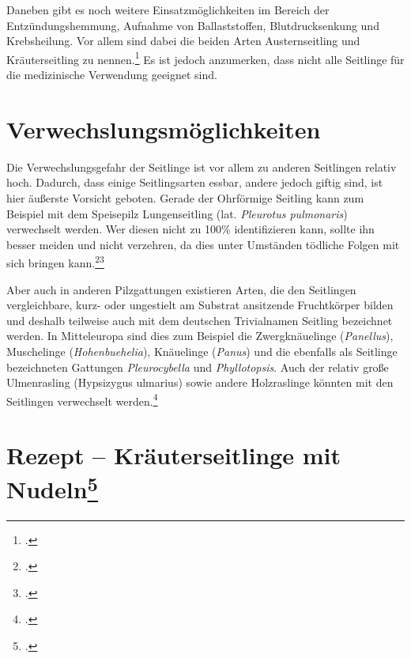 \documentclass[a4paper,abstracton]{scrreprt}
\begin{document}
Daneben gibt es noch weitere Einsatzmöglichkeiten im Bereich der Entzündungshemmung, Aufnahme von Ballaststoffen, Blutdrucksenkung und Krebsheilung.
Vor allem sind dabei die beiden Arten Austernseitling und Kräuterseitling zu nennen.\footcite{vital} Es ist jedoch anzumerken, dass nicht alle Seitlinge für die medizinische Verwendung geeignet sind.

\section{Verwechslungsmöglichkeiten}
Die Verwechslungsgefahr der Seitlinge ist vor allem zu anderen Seitlingen relativ hoch. Dadurch, dass einige Seitlingsarten essbar, andere jedoch giftig sind, ist hier äußerste Vorsicht geboten. Gerade der Ohrförmige Seitling kann zum Beispiel mit dem Speisepilz Lungenseitling (lat. \emph{Pleurotus pulmonaris}) verwechselt werden. Wer diesen nicht zu 100\% identifizieren kann, sollte ihn besser meiden und nicht verzehren, da dies unter Umständen tödliche Folgen mit sich bringen kann.\footcite{pg_ohrfoermig}\footcite{deutschlandradio}

Aber auch in anderen Pilzgattungen existieren Arten, die den Seitlingen vergleichbare, kurz- oder ungestielt am Substrat ansitzende Fruchtkörper bilden und deshalb teilweise auch mit dem deutschen Trivialnamen Seitling bezeichnet werden. In Mitteleuropa sind dies zum Beispiel die Zwergknäuelinge (\emph{Panellus}), Muschelinge (\emph{Hohenbuehelia}), Knäuelinge (\emph{Panus}) und die ebenfalls als Seitlinge bezeichneten Gattungen \emph{Pleurocybella} und \emph{Phyllotopsis}. Auch der relativ große Ulmenrasling (Hypsizygus ulmarius) sowie andere Holzraslinge könnten mit den Seitlingen verwechselt werden.\footcite{faktenuber}

\section{Rezept -- Kräuterseitlinge mit Nudeln\footcite{rezept}}
\end{document}

